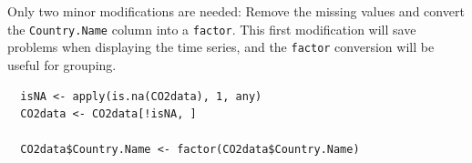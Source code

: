 Only two minor modifications are needed: Remove the missing values and
convert the \texttt{Country.Name} column into a \texttt{factor}. This first
modification will save problems when displaying the time series, and
the \texttt{factor} conversion will be useful for grouping.
\lstset{language=r,label= ,caption= ,captionpos=b,numbers=none}
\begin{lstlisting}
  isNA <- apply(is.na(CO2data), 1, any)
  CO2data <- CO2data[!isNA, ]

  CO2data$Country.Name <- factor(CO2data$Country.Name)
\end{lstlisting}
